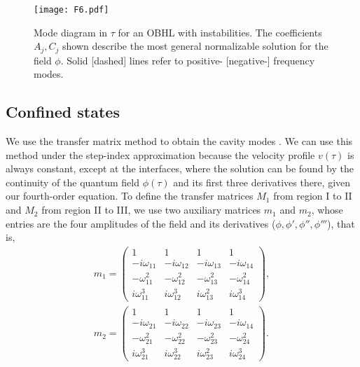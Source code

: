 \documentclass[aps,pra,reprint,amsmath,amssymb,showpacs,groupedaddress,floatfix]{revtex4-1}
\begin{document}
\begin{figure}\centering
	\texttt{[image: F6.pdf]}
	\caption{Mode diagram in $\tau$ for an OBHL with instabilities. The coefficients $A_j,C_j$ shown describe the most general normalizable solution for the field $\phi$. Solid [dashed] lines refer to positive- [negative-] frequency modes.}
	\label{fig6cavity}
\end{figure}

\subsection{Confined states}\label{secconfined}
We use the transfer matrix method to obtain the cavity modes \cite{2018Bermudez}. We can use this method under the step-index approximation because the velocity profile $v(\tau)$ is always constant, except at the interfaces, where the solution can be found by the continuity of the quantum field $\phi(\tau)$ and its first three derivatives there, given our fourth-order equation. To define the transfer matrices $M_1$ from region I to II and $M_2$ from region II to III, we use two auxiliary matrices $m_1$ and $m_2$, whose entries are the four amplitudes of the field and its derivatives ($\phi,\phi', \phi'',\phi'''$), that is,
\begin{align}
m_1=\begin{pmatrix}
1 & 1 & 1 & 1 \\
-i\omega_{11} &-i\omega_{12}  & -i\omega_{13} &-i\omega_{14} \\
-\omega_{11}^2 &- \omega_{12}^2 &-\omega_{13}^2  &-\omega_{14}^2 \\
i\omega_{11}^3&  i\omega_{12}^3&  i\omega_{13}^2 & i\omega_{14}^3
\end{pmatrix},\\
m_2=\begin{pmatrix}
1 & 1 & 1 & 1 \\
-i\omega_{21} &-i\omega_{22}  & -i\omega_{23} &-i\omega_{14} \\
-\omega_{21}^2 &- \omega_{22}^2 &-\omega_{23}^2  &-\omega_{24}^2 \\
i\omega_{21}^3&  i\omega_{22}^3&  i\omega_{23}^2 & i\omega_{24}^3
\end{pmatrix}.
\end{align}
\end{document}
